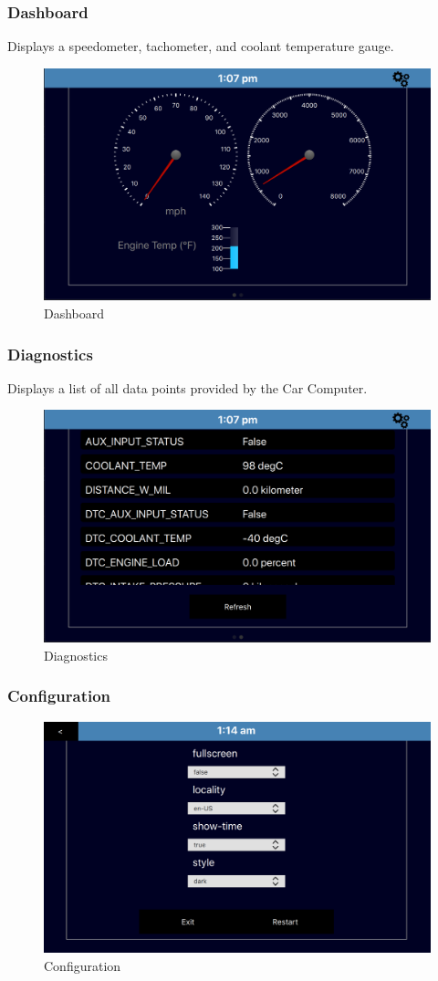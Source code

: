\documentclass{article}
\numberwithin{figure}{section}
\begin{document}
\hypertarget{dashboard}{%
\subsubsection{Dashboard}\label{dashboard}}
Displays a speedometer, tachometer, and coolant temperature gauge.

\begin{figure}[H]
\centering
\includegraphics[width=0.7\columnwidth]{./resources/dash.png}
\caption{Dashboard}
\end{figure}

\hypertarget{diagnostics}{%
\subsubsection{Diagnostics}\label{diagnostics}}
Displays a list of all data points provided by the Car Computer.

\begin{figure}[H]
\centering
\includegraphics[width=0.7\columnwidth]{./resources/diagnostics.png}
\caption{Diagnostics}
\end{figure}

\hypertarget{configuration}{%
\subsubsection{Configuration}\label{configuration}}

\begin{figure}[H]
\centering
\includegraphics[width=0.7\columnwidth]{./resources/configuration.png}
\caption{Configuration}
\end{figure}
\end{document}
